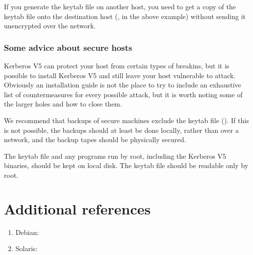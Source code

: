 \documentclass[letterpaper,10pt,english]{sphinxmanual}
\begin{document}
\sphinxAtStartPar
If you generate the keytab file on another host, you need to get a
copy of the keytab file onto the destination host (, in
the above example) without sending it unencrypted over the network.


\subsubsection{Some advice about secure hosts}
\label{\detokenize{admin/install_appl_srv:some-advice-about-secure-hosts}}
\sphinxAtStartPar
Kerberos V5 can protect your host from certain types of break\sphinxhyphen{}ins, but
it is possible to install Kerberos V5 and still leave your host
vulnerable to attack.  Obviously an installation guide is not the
place to try to include an exhaustive list of countermeasures for
every possible attack, but it is worth noting some of the larger holes
and how to close them.

\sphinxAtStartPar
We recommend that backups of secure machines exclude the keytab file
({\hyperref[\detokenize{mitK5defaults:paths}]{}}).  If this is not possible, the backups should at least be
done locally, rather than over a network, and the backup tapes should
be physically secured.

\sphinxAtStartPar
The keytab file and any programs run by root, including the Kerberos
V5 binaries, should be kept on local disk.  The keytab file should be
readable only by root.


\section{Additional references}
\label{\detokenize{admin/install:additional-references}}\begin{enumerate}
%
\item {} 
\sphinxAtStartPar
Debian: 

\item {} 
\sphinxAtStartPar
Solaris: 

\end{enumerate}
\end{document}
